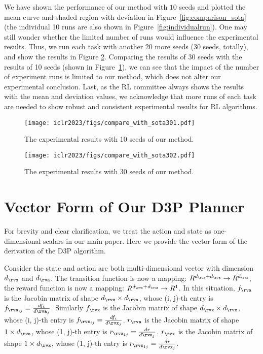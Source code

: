 \documentclass{article} %
\newcommand{\revision}[1]{{#1}}
\begin{document}
\revision{We have shown the performance of our method with $10$ seeds and plotted the mean curve and shaded region with deviation in Figure~\ref{fig:comparison_sota} (the individual 10 runs are also shown in Figure~\ref{fig:individualrun}). One may still wonder whether the limited number of runs would influence the experimental results. Thus, we run each task with another 20 more seeds (30 seeds, totally), and show the results in Figure \ref{fig:exp30seeds}. Comparing the results of 30 seeds with the results of 10 seeds (shown in Figure~\ref{fig:exp10seeds}), we can see that the impact of the number of experiment runs is limited to our method, which does not alter our experimental conclusion. Last, as the RL committee always shows the results with the mean and deviation values, we acknowledge that more runs of each task are needed to show robust and consistent experimental results for RL algorithms.}
\begin{figure}[!htb]
    \centering
    \texttt{[image: iclr2023/figs/compare\_with\_sota301.pdf]}
    \caption{\revision{The experimental results with 10 seeds of our method.}}
    \label{fig:exp10seeds}
\end{figure}

\begin{figure}[!htb]
    \centering
    \texttt{[image: iclr2023/figs/compare\_with\_sota302.pdf]}
    \caption{\revision{The experimental results with 30 seeds of our method.}}
    \label{fig:exp30seeds}
\end{figure}


\section{\revision{Vector Form of Our D3P Planner}}\label{sec: vector form}
For brevity and clear clarification, we treat the action and state as one-dimensional scalars in our main paper. Here we provide the vector form of the derivation of the D3P algorithm.

Consider the state and action are both multi-dimensional vector with dimension $d_\rvx$ and $d_\rva$. The transition function is now a mapping: $R^{d_\rvx + d_\rva} \to R^{d_\rvx}$, the reward function is now a mapping: $R^{d_\rvx + d_\rva} \to R^1$. In this situation, $f_\rva$ is the Jacobin matrix of shape $d_\rvx \times  d_\rva $, whose  (i, j)-th entry is  $f_{\rva_{ij}} = \frac{df_i}{d\rva_j}$. Similarly $f_\rvx$ is the Jacobin matrix of shape $d_\rvx \times  d_\rvx $, whose  (i, j)-th entry is  $f_{\rvx_{ij}} = \frac{df_i}{d\rvx_j}$. $r_\rva$ is the Jacobin matrix of shape $1 \times  d_\rva $, whose  (1, j)-th entry is  $r_{\rva_{1j}} = \frac{dr}{d\rva_j}$.  $r_\rvx$ is the Jacobin matrix of shape $1 \times  d_\rvx $, whose  (1, j)-th entry is  $r_{\rvx_{1j}} = \frac{dr}{d\rvx_j}$. 
\end{document}
